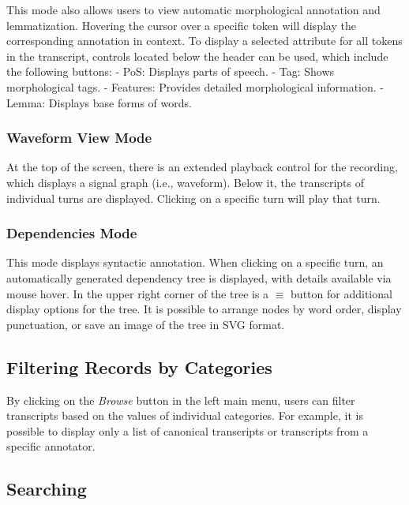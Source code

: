 \documentclass[
]{article}
\begin{document}
This mode also allows users to view automatic morphological annotation
and lemmatization. Hovering the cursor over a specific token will
display the corresponding annotation in context. To display a selected
attribute for all tokens in the transcript, controls located below the
header can be used, which include the following buttons: - PoS: Displays
parts of speech. - Tag: Shows morphological tags. - Features: Provides
detailed morphological information. - Lemma: Displays base forms of
words.

\hypertarget{waveform-view-mode}{%
\subsubsection{Waveform View Mode}\label{waveform-view-mode}}

At the top of the screen, there is an extended playback control for the
recording, which displays a signal graph (i.e., waveform). Below it, the
transcripts of individual turns are displayed. Clicking on a specific
turn will play that turn.

\hypertarget{dependencies-mode}{%
\subsubsection{Dependencies Mode}\label{dependencies-mode}}

This mode displays syntactic annotation. When clicking on a specific
turn, an automatically generated dependency tree is displayed, with
details available via mouse hover. In the upper right corner of the tree
is a $\equiv$ button for additional display options for the tree. It is
possible to arrange nodes by word order, display punctuation, or save an
image of the tree in SVG format.

\hypertarget{filtering-records-by-categories}{%
\subsection{Filtering Records by
Categories}\label{filtering-records-by-categories}}

By clicking on the \emph{Browse} button in the left main menu, users can
filter transcripts based on the values of individual categories. For
example, it is possible to display only a list of canonical transcripts
or transcripts from a specific annotator.

\hypertarget{searching}{%
\subsection{Searching}\label{searching}}
\end{document}
